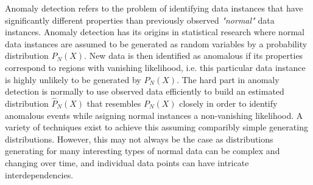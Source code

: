 \documentclass[a4paper,12pt,twoside]{report}
\begin{document}
Anomaly detection refers to the problem of identifying data instances that have significantly different properties than previously observed \textit{"normal"} data instances. Anomaly detection has its origins in statistical research where normal data instances are assumed to be generated as random variables by a probability distribution $P_\textit{N}(X)$. New data is then identified as anomalous if its properties correspond to regions with vanishing likelihood, i.e. this particular data instance is highly unlikely to be generated by $P_\textit{N}(X)$. The hard part in anomaly detection is normally to use observed data efficiently to build an estimated distribution $\hat{P}_\textit{N}(X)$ that resembles $P_\textit{N}(X)$ closely in order to identify anomalous events while asigning normal instances a non-vanishing likelihood. A variety of techniques exist to achieve this assuming comparibly simple generating distributions. However, this may not always be the case as distributions generating for many interesting types of normal data can be complex and changing over time, and individual data points can have intricate interdependencies. 
\end{document}
